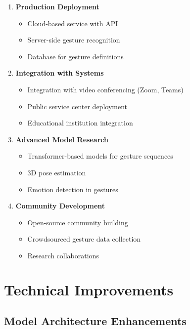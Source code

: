 \begin{enumerate}
    \item \textbf{Production Deployment}
    \begin{itemize}
        \item Cloud-based service with API
        \item Server-side gesture recognition
        \item Database for gesture definitions
    \end{itemize}
    
    \item \textbf{Integration with Systems}
    \begin{itemize}
        \item Integration with video conferencing (Zoom, Teams)
        \item Public service center deployment
        \item Educational institution integration
    \end{itemize}
    
    \item \textbf{Advanced Model Research}
    \begin{itemize}
        \item Transformer-based models for gesture sequences
        \item 3D pose estimation
        \item Emotion detection in gestures
    \end{itemize}
    
    \item \textbf{Community Development}
    \begin{itemize}
        \item Open-source community building
        \item Crowdsourced gesture data collection
        \item Research collaborations
    \end{itemize}
\end{enumerate}

\section{Technical Improvements}

\subsection{Model Architecture Enhancements}

